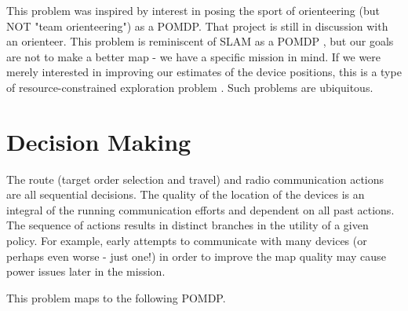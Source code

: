 \documentclass[twoside,11pt]{article}
\begin{document}
This problem was inspired by interest in posing the sport of orienteering (but NOT "team orienteering") as a POMDP. That project is still in discussion with an orienteer. This problem is reminiscent of SLAM as a POMDP \citep{Slam2023}, but our goals are not to make a better map - we have a specific mission in mind. If we were merely interested in improving our estimates of the device positions, this is a type of resource-constrained exploration problem \citep{figop}. Such problems are ubiquitous.


\section{Decision Making}
The route (target order selection and travel) and radio communication actions are all sequential decisions. The quality of the location of the devices is an integral of the running communication efforts and dependent on all past actions. The sequence of actions results in distinct branches in the utility of a given policy. For example, early attempts to communicate with many devices (or perhaps even worse - just one!) in order to improve the map quality may cause power issues later in the mission.

This problem maps to the following POMDP.
\end{document}
